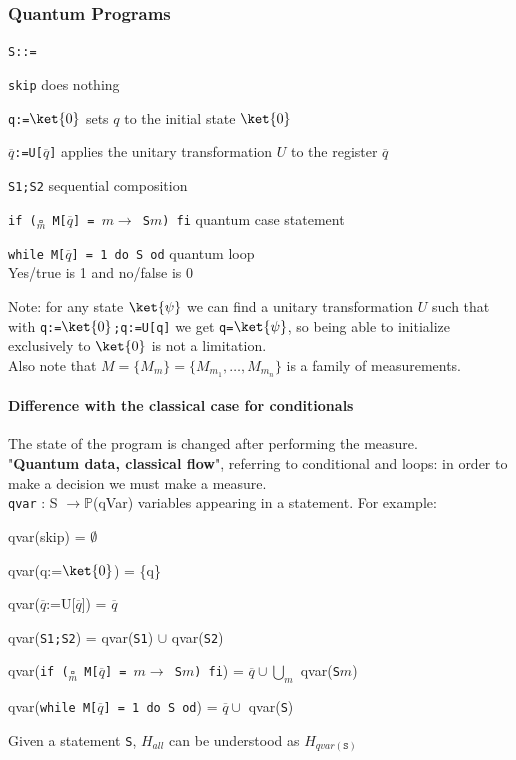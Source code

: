 \documentclass[10pt]{report}
\begin{document}
\subsubsection{Quantum Programs}
\texttt{S::=}
\begin{list}{}{}
	\item \texttt{skip} does nothing
	\item \texttt{q:=$\ket{0}$} sets $q$ to the initial state $\ket{0}$
	\item \texttt{$\overline{q}$:=U[$\overline{q}$]} applies the unitary transformation $U$ to the register $\overline{q}$
	\item \texttt{S1;S2} sequential composition
	\item \texttt{if ($\underset{m}{\square}$ M[$\overline{q}$] = $m\rightarrow$ S$m$) fi} quantum case statement %
	\item \texttt{while M[$\overline{q}$] = 1 do S od} quantum loop\\
	Yes/true is 1 and no/false is 0
\end{list}
Note: for any state $\ket{\psi}$ we can find a unitary transformation $U$ such that with \texttt{q:=$\ket{0}$;q:=U[q]} we get \texttt{q=$\ket{\psi}$}, so being able to initialize exclusively to $\ket{0}$ is not a limitation.\\
Also note that $M = \{M_m\} = \{M_{m_1},\ldots,M_{m_n}\}$ is a family of measurements.
\paragraph{Difference with the classical case for conditionals} The state of the program is changed after performing the measure.\\
"\textbf{Quantum data, classical flow}", referring to conditional and loops: in order to make a decision we must make a measure.\\
\texttt{qvar} : S $\rightarrow \mathbb{P}$(qVar) variables appearing in a statement. For example:
\begin{list}{}{}
	\item qvar(skip) = $\emptyset$
	\item qvar(q:=$\ket{0}$) = \{q\}
	\item qvar($\overline{q}$:=U[$\overline{q}$]) = $\overline{q}$
	\item qvar(\texttt{S1;S2}) = qvar(\texttt{S1}) $\cup$ qvar(\texttt{S2})
	\item qvar(\texttt{if ($\underset{m}{\square}$ M[$\overline{q}$] = $m\rightarrow$ S$m$) fi}) = $\overline{q}\cup\bigcup_m$ qvar(\texttt{S$m$})
	\item qvar(\texttt{while M[$\overline{q}$] = 1 do S od}) = $\overline{q}\cup$ qvar(\texttt{S})
\end{list}
Given a statement \texttt{S}, $H_{all}$ can be understood as $H_{qvar(\texttt{S})}$
\end{document}
